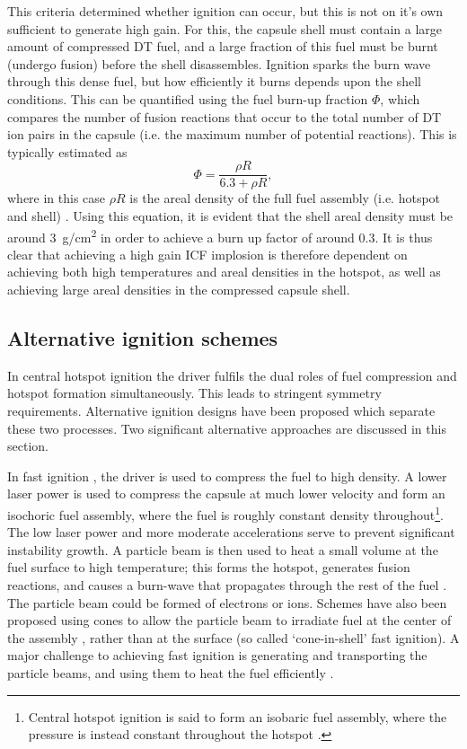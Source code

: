 This criteria determined whether ignition can occur, but this is not on it's own sufficient to generate high gain. For this, the capsule shell must contain a large amount of compressed DT fuel, and a large fraction of this fuel must be burnt (undergo fusion) before the shell disassembles. Ignition sparks the burn wave through this dense fuel, but how efficiently it burns depends upon the shell conditions. This can be quantified using the fuel burn-up fraction $\Phi$, which compares the number of fusion reactions that occur to the total number of DT ion pairs in the capsule (i.e. the maximum number of potential reactions). This is typically estimated as 
\begin{equation} \Phi = \frac{ \rho R} {6.3 + \rho R}, \end{equation}
where in this case $\rho R$ is the areal density of the full fuel assembly (i.e. hotspot and shell) \cite{Fraley1974}. Using this equation, it is evident that the shell areal density must be around 3~\si[per-mode=symbol]{\gram\per\centi\meter\squared} in order to achieve a burn up factor of around 0.3. It is thus clear that achieving a high gain ICF implosion is therefore dependent on achieving both high temperatures and areal densities in the hotspot, as well as achieving large areal densities in the compressed capsule shell.

\subsection{Alternative ignition schemes}
In central hotspot ignition the driver fulfils the dual roles of fuel compression and hotspot formation simultaneously. This leads to stringent symmetry requirements. Alternative ignition designs have been proposed which separate these two processes. Two significant alternative approaches are discussed in this section.

In fast ignition \cite{Tabak1994}, the driver is used to compress the fuel to high density. A lower laser power is used to compress the capsule at much lower velocity and form an isochoric fuel assembly, where the fuel is roughly constant density throughout\footnote{Central hotspot ignition is said to form an isobaric fuel assembly, where the pressure is instead constant throughout the hotspot \cite{Atzeni2008}.}. The low laser power and more moderate accelerations serve to prevent significant instability growth. A particle beam is then used to heat a small volume at the fuel surface to high temperature; this forms the hotspot, generates fusion reactions, and causes a burn-wave that propagates through the rest of the fuel \cite{Tabak2005, Tabak2006}. The particle beam could be formed of electrons or ions. Schemes have also been proposed using cones to allow the particle beam to irradiate fuel at the center of the assembly \cite{Kodama2002, Kitagawa2002}, rather than at the surface (so called `cone-in-shell' fast ignition). A major challenge to achieving fast ignition is generating and transporting the particle beams, and using them to heat the fuel efficiently \cite{Norreys2014}.


